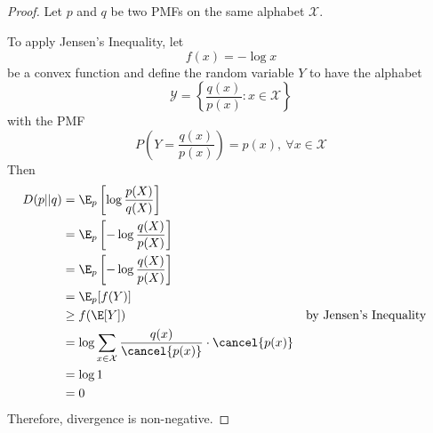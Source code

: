 \documentclass[
  coursecode={MTHE 474},
  assignmentname={Homework \homeworknumber},
  studentnumber=20053722,
  name={Bryan Hoang},
]{
  ltxanswer%
}
\begin{document}
\begin{questions}
\begin{parts}
      \part{}
      \begin{solution}
        \begin{proof}
          Let \(p\) and \(q\) be two PMFs on the same alphabet \(\mathcal{X}\).

          To apply Jensen's Inequality, let
          \begin{equation*}
            f(x)=-\log x
          \end{equation*}
          be a convex function and define the random variable \(Y\) to have the alphabet
          \begin{equation*}
            \mathcal{Y}=\left\{\frac{q(x)}{p(x)} : x \in \mathcal{X}\right\}
          \end{equation*}
          with the PMF
          \begin{equation*}
            P\left(Y=\frac{q(x)}{p(x)}\right)=p(x),\ \forall x \in \mathcal{X}
          \end{equation*}
          Then
          \begin{align*}
            D(p||q) &= \E_{p}\left[\log\frac{p(X)}{q(X)}\right]                                                                   \\
                    &= \E_{p}\left[-\log\frac{q(X)}{p(X)}\right]                                                                  \\
                    &= \E_{p}\left[-\log\frac{q(X)}{p(X)}\right]                                                                  \\
                    &= \E_{p}[f(Y)]                                                                                               \\
                    &\ge f(\E[Y])                                                                & &\text{by Jensen's Inequality} \\
                    &= \log\sum_{x\in\mathcal{X}} \frac{q(x)}{\cancel{p(x)}} \cdot \cancel{p(x)}                                  \\
                    &= \log 1                                                                                                     \\
                    &= 0
          \end{align*}
          Therefore, divergence is non-negative.
        \end{proof}
      \end{solution}
    \end{parts}
  \end{questions}
\end{document}
